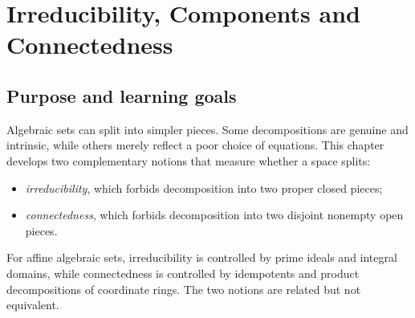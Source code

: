 %
%
%
%

\chapter{Irreducibility, Components and Connectedness}
\label{ch:irreducibility-components-connectedness}

\section*{Purpose and learning goals}

Algebraic sets can split into simpler pieces.  Some decompositions are genuine and
intrinsic, while others merely reflect a poor choice of equations.  This chapter develops
two complementary notions that measure whether a space splits:

\begin{itemize}
  \item \emph{irreducibility}, which forbids decomposition into two proper closed pieces;
  \item \emph{connectedness}, which forbids decomposition into two disjoint nonempty open
        pieces.
\end{itemize}

For affine algebraic sets, irreducibility is controlled by prime ideals and integral
domains, while connectedness is controlled by idempotents and product decompositions of
coordinate rings.  The two notions are related but not equivalent.

